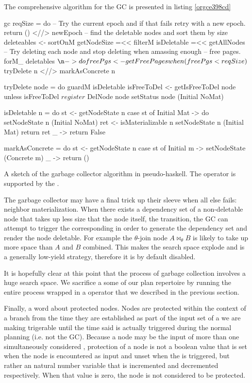 The comprehensive algorithm for the GC is presented in listing \ref{orgce398cd}

\begin{code}
\begin{haskellcode}
gc reqSize = do
  -- Try the current epoch and if that fails retry with a new epoch.
  return () <//> newEpoch
  -- find the deletable nodes and sort them by size
  deleteables <- sortOnM getNodeSize =<< filterM isDeletable =<< getAllNodes
  -- Try deleting each node and stop deleting when amassing enough
  -- free pages.
  forM_ deletables $ \n -> do
    freePgs <- getFreePages
    when (freePgs < reqSize) $ tryDelete n <//> markAsConcrete n

tryDelete node = do
  guardM isDeletable
  isFreeToDel <- getIsFreeToDel node
  unless isFreeToDel $ register $ DelNode node
  setStatus node (Initial NoMat)

isDeletable n = do
  st <- getNodeState n
  case st of
    Initial Mat -> do
      setNodeState n (Initial NoMat)
      ret <- isMaterializable n
      setNodeState n (Initial Mat)
      return ret
    _ -> return False

markAsConcrete = do
  st <- getNodeState n
  case st of
    Initial m -> setNodeState (Concrete m)
    _ -> return ()
\end{haskellcode}
\caption{\label{orgce398cd}A sketch of the garbage collector algorithm in pseudo-haskell. The \hask{<//>} operator  is supported by the .}
\end{code}

The garbage collector may have a final trick up their sleeve when all
else fails: neighbor materialization. When there exists a dependency
set of a non-deletable node that takes up less size that the node
itself, the transition, the GC can attempt to trigger the
corresponding  in order to generate the dependency set and
render the node deletable. For example the \(\theta\)-join node \(A
\Join_\theta B\) is likely to take up more space than \(A\) and \(B\)
combined. This makes the search space explode and is a generally
low-yield strategy, therefore it is by default disabled.

It is hopefully clear at this point that the process of garbage
collection involves a huge search space. We sacrifice a some of our
plan repertoire by running the entire process wrapped in a 
operator that we described in the previous section.

Finally, a word about protected nodes. Nodes are protected within the
context of a branch from the time they are established as part of the
input set of a  we are making trigerable until the time said
 is actually triggered during the normal planning (i.e. not
the GC). Because a node may be the input of more than one
simultaneously considered , protection of a node is not a
boolean value that is set when the node is encountered as 
input and unset when the  is triggered, but rather an natural
number variable that is incremented and decremented respectively. When
that value is zero, the node is not considered to be protected.


